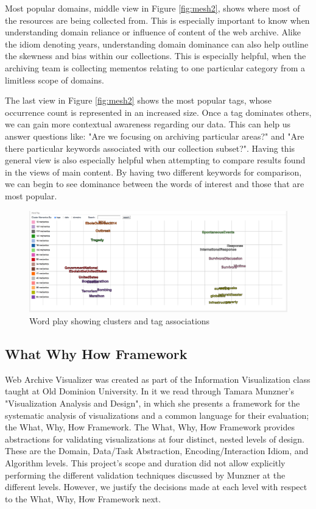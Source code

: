 \documentclass[10pt,journal,compsoc]{IEEEtran}
\begin{document}
Most popular domains, middle view in Figure \ref{fig:mesh2}, shows where most of the resources are being collected from. This is especially important to know when understanding domain reliance or influence of content of the web archive. Alike the idiom denoting years, understanding domain dominance can also help outline the skewness and bias within our collections. This is especially helpful, when the archiving team is collecting mementos relating to one particular category from a limitless scope of domains. \par

The last view in Figure \ref{fig:mesh2} shows the most popular tags, whose occurrence count is represented in an increased size. Once a tag dominates others, we can gain more contextual awareness regarding our data. This can help us answer questions like: "Are we focusing on archiving particular areas?" and "Are there particular keywords associated with our collection subset?". Having this general view is also especially helpful when attempting to compare results found in the views of main content. By having two different keywords for comparison, we can begin to see dominance between the words of interest and those that are most popular. \par

\begin{figure}
\centering
\includegraphics[width=\textwidth]{Figure6}
\caption{Word play showing clusters and tag associations}
\label{fig:mesh6}
\end{figure}


\subsection{What Why How Framework}
Web Archive Visualizer was created as part of the Information Visualization class taught
at Old Dominion University. In it we read through Tamara Munzner's "Visualization 
Analysis and Design", in which she presents a framework for the systematic analysis
of visualizations and a common language for their evaluation; the What, Why, How 
Framework. The What, Why, How Framework provides abstractions for validating visualizations
at four distinct, nested levels of design. These are the Domain, Data/Task Abstraction, Encoding/Interaction Idiom, and Algorithm levels.
This project's scope and duration did not allow explicitly performing the different
validation techniques discussed by Munzner at the different levels. 
However, we justify the decisions made at each level with respect to the What, Why, How 
Framework next.
\end{document}
